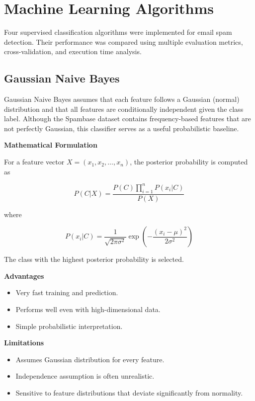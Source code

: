 \documentclass[12pt,a4paper]{article}
\begin{document}
	\section{Machine Learning Algorithms}
	
	Four supervised classification algorithms were implemented for email spam detection. Their performance was compared using multiple evaluation metrics, cross-validation, and execution time analysis.
	
	\subsection{Gaussian Naive Bayes}
	
	Gaussian Naive Bayes assumes that each feature follows a Gaussian (normal) distribution and that all features are conditionally independent given the class label. Although the Spambase dataset contains frequency-based features that are not perfectly Gaussian, this classifier serves as a useful probabilistic baseline.
	
	\textbf{Mathematical Formulation}
	
	For a feature vector $X=(x_1,x_2,\ldots,x_n)$, the posterior probability is computed as
	
	\[
	P(C|X)=
	\frac{P(C)\prod_{i=1}^{n}P(x_i|C)}
	{P(X)}
	\]
	
	where
	
	\[
	P(x_i|C)=
	\frac{1}{\sqrt{2\pi\sigma^2}}
	\exp
	\left(
	-\frac{(x_i-\mu)^2}{2\sigma^2}
	\right)
	\]
	
	The class with the highest posterior probability is selected.
	
	\textbf{Advantages}
	
	\begin{itemize}
		\item Very fast training and prediction.
		\item Performs well even with high-dimensional data.
		\item Simple probabilistic interpretation.
	\end{itemize}
	
	\textbf{Limitations}
	
	\begin{itemize}
		\item Assumes Gaussian distribution for every feature.
		\item Independence assumption is often unrealistic.
		\item Sensitive to feature distributions that deviate significantly from normality.
	\end{itemize}
	
\end{document}
